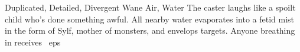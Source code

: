   {Duplicated, Detailed, Divergent}%
  {Wane}%
  {Air, Water}%
  {}%
  {
    The caster laughs like a spoilt child who's done something awful.
    All nearby water evaporates into a fetid mist in the form of Sylf, mother of monsters, and envelops  targets.
    Anyone breathing in receives \showDam~\glspl{ep}}%
  {}
